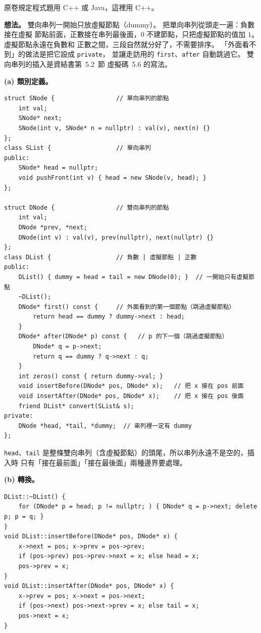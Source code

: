 \begin{pastsoln}
原卷規定程式題用 C++ 或 Java，這裡用 C++。

\textbf{想法。} 雙向串列一開始只放虛擬節點（dummy）。 把單向串列從頭走一遍：負數接在虛擬
節點前面，正數接在串列最後面，$0$ 不建節點，只把虛擬節點的值加 $1$。 虛擬節點永遠在負數和
正數之間，三段自然就分好了，不需要排序。 「外面看不到」的做法是把它設成 \texttt{private}，
並讓走訪用的 \texttt{first}、\texttt{after} 自動跳過它。 雙向串列的插入是資結書第~5.2~節
虛擬碼~5.6 的寫法。

\textbf{(a) 類別定義。}
\begin{verbatim}
struct SNode {                 // 單向串列的節點
    int val;
    SNode* next;
    SNode(int v, SNode* n = nullptr) : val(v), next(n) {}
};
class SList {                  // 單向串列
public:
    SNode* head = nullptr;
    void pushFront(int v) { head = new SNode(v, head); }
};

struct DNode {                 // 雙向串列的節點
    int val;
    DNode *prev, *next;
    DNode(int v) : val(v), prev(nullptr), next(nullptr) {}
};
class DList {                  // 負數 | 虛擬節點 | 正數
public:
    DList() { dummy = head = tail = new DNode(0); }  // 一開始只有虛擬節點
    ~DList();
    DNode* first() const {     // 外面看到的第一個節點（跳過虛擬節點）
        return head == dummy ? dummy->next : head;
    }
    DNode* after(DNode* p) const {   // p 的下一個（跳過虛擬節點）
        DNode* q = p->next;
        return q == dummy ? q->next : q;
    }
    int zeros() const { return dummy->val; }
    void insertBefore(DNode* pos, DNode* x);   // 把 x 接在 pos 前面
    void insertAfter(DNode* pos, DNode* x);    // 把 x 接在 pos 後面
    friend DList* convert(SList& s);
private:
    DNode *head, *tail, *dummy;  // 串列裡一定有 dummy
};
\end{verbatim}
\texttt{head}、\texttt{tail} 是整條雙向串列（含虛擬節點）的頭尾，所以串列永遠不是空的，插入時
只有「接在最前面」「接在最後面」兩種邊界要處理。

\textbf{(b) 轉換。}
\begin{verbatim}
DList::~DList() {
    for (DNode* p = head; p != nullptr; ) { DNode* q = p->next; delete p; p = q; }
}
void DList::insertBefore(DNode* pos, DNode* x) {
    x->next = pos; x->prev = pos->prev;
    if (pos->prev) pos->prev->next = x; else head = x;
    pos->prev = x;
}
void DList::insertAfter(DNode* pos, DNode* x) {
    x->prev = pos; x->next = pos->next;
    if (pos->next) pos->next->prev = x; else tail = x;
    pos->next = x;
}


\end{verbatim}
\end{pastsoln}
